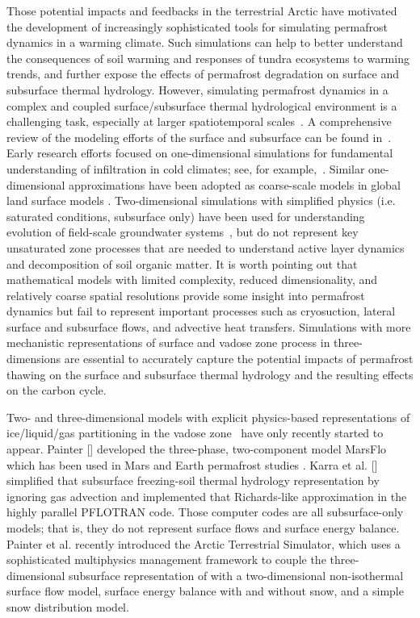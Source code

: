 \documentclass[review]{elsarticle}
\begin{document}
Those potential impacts and feedbacks in the terrestrial Arctic have motivated the development of increasingly sophisticated tools for simulating permafrost dynamics in a warming climate. Such simulations can help to better understand the consequences of soil warming and responses of tundra ecosystems to warming trends, and further expose the effects of permafrost degradation on surface and subsurface thermal hydrology. However, simulating permafrost dynamics in a complex and coupled surface/subsurface thermal hydrological environment is a challenging task, especially at larger spatiotemporal scales~\cite{painter2013modeling}.  A comprehensive review of the modeling efforts of the surface and subsurface can be found in~\cite{kurylyk2014climate}. Early research efforts focused on one-dimensional simulations for fundamental understanding of infiltration in cold climates; see, for example,~\cite{harlan1973analysis, guymon1974coupled, taylor1978model}. Similar one-dimensional approximations have been adopted as coarse-scale models in global land surface models \cite{takata2003development, nicolsky2007improved, lawrence2012simulation, koven2013analysis}.  Two-dimensional simulations with simplified physics (i.e. saturated conditions, subsurface only) have been used for understanding evolution of field-scale groundwater systems~\cite{mckenzie2007groundwater, bense2009evolution}, but do not represent key unsaturated zone processes that are needed to understand active layer dynamics and decomposition of soil organic matter.   It is worth pointing out that mathematical models with limited complexity, reduced dimensionality, and relatively coarse spatial resolutions provide some insight into permafrost dynamics but fail to represent important processes such as cryosuction, lateral surface and subsurface flows, and advective heat transfers. Simulations with more mechanistic representations of surface and vadose zone process in three-dimensions are essential to accurately capture the potential impacts of permafrost thawing on the surface and subsurface thermal hydrology and the resulting effects on the carbon cycle. 

Two- and three-dimensional models with explicit physics-based representations of ice/liquid/gas partitioning in the vadose zone~\cite{painter2014constitutive} have only recently started to appear. Painter [\citeyear{marsflo}] developed the three-phase, two-component model MarsFlo which has been used in Mars \cite{grimm2009mars} and Earth permafrost studies \cite{frampton2011}.  Karra et al. [\citeyear{karra2014three}] simplified that subsurface freezing-soil thermal hydrology representation by ignoring gas advection and implemented that Richards-like approximation in the highly parallel PFLOTRAN \cite{pflotran} code. Those computer codes are all subsurface-only models; that is, they do not represent surface flows and surface energy balance. Painter et al. \citeyear{spainter2016integrated} recently introduced the Arctic Terrestrial Simulator, which uses a sophisticated multiphysics management framework \cite{ecoon2016managing} to couple the three-dimensional subsurface representation of \cite{karra2014three} with a two-dimensional non-isothermal surface flow model, surface energy balance with and without snow, and a simple snow distribution model. 
\end{document}
